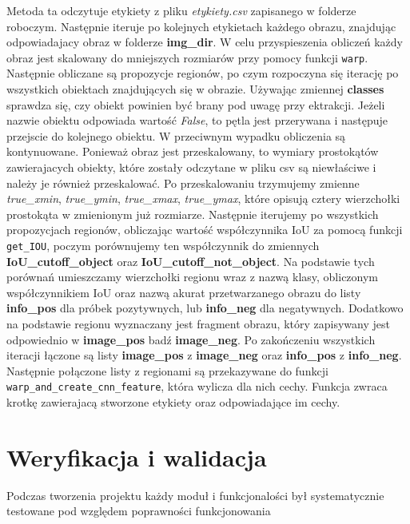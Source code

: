 \documentclass[a4paper,twoside,12pt]{book}
\begin{document}
{Metoda ta odczytuje etykiety z pliku \emph{etykiety.csv} zapisanego w folderze roboczym. Następnie iteruje po kolejnych etykietach każdego obrazu, znajdując odpowiadajacy obraz w folderze \textbf{img\_dir}. W celu przyspieszenia obliczeń każdy obraz jest skalowany do mniejszych rozmiarów przy pomocy funkcji \lstinline|warp|. Następnie obliczane są propozycje regionów, po czym rozpoczyna się iterację po wszystkich obiektach znajdujących się w obrazie. Używając zmiennej \textbf{classes} sprawdza się, czy obiekt powinien być brany pod uwagę przy ektrakcji. Jeżeli nazwie obiektu odpowiada wartość \emph{False}, to pętla jest przerywana i następuje przejscie do kolejnego obiektu. W przeciwnym wypadku obliczenia są kontynuowane. Ponieważ obraz jest przeskalowany, to wymiary prostokątów zawierajacych obiekty, które zostały odczytane w pliku csv są niewłaściwe i należy je również przeskalować. Po przeskalowaniu trzymujemy zmienne \emph{true\_xmin}, \emph{true\_ymin}, \emph{true\_xmax}, \emph{true\_ymax}, które opisują cztery wierzchołki prostokąta w zmienionym już rozmiarze. Następnie iterujemy po wszystkich propozycjach regionów, obliczając wartość współczynnika IoU za pomocą funkcji \lstinline|get_IOU|, poczym  porównujemy ten współczynnik do zmiennych \textbf{IoU\_cutoff\_object} oraz \textbf{IoU\_cutoff\_not\_object}. Na podstawie tych porównań umieszczamy wierzchołki regionu wraz z nazwą klasy, obliczonym współczynnikiem IoU oraz nazwą akurat przetwarzanego obrazu do listy \textbf{info\_pos} dla próbek pozytywnych, lub \textbf{info\_neg} dla negatywnych. Dodatkowo na podstawie regionu wyznaczany jest fragment obrazu, który zapisywany jest odpowiednio w \textbf{image\_pos} badź \textbf{image\_neg}. Po zakończeniu wszystkich iteracji łączone są listy \textbf{image\_pos} z \textbf{image\_neg} oraz \textbf{info\_pos} z \textbf{info\_neg}. Następnie połączone listy z regionami są przekazywane do funkcji \lstinline|warp_and_create_cnn_feature|, która wylicza dla nich cechy. Funkcja zwraca krotkę zawierajacą stworzone etykiety oraz odpowiadające im cechy.




\chapter{Weryfikacja i walidacja}
{Podczas tworzenia projektu każdy moduł i funkcjonalości był systematycznie testowane pod względem poprawności funkcjonowania}
}
\end{document}
